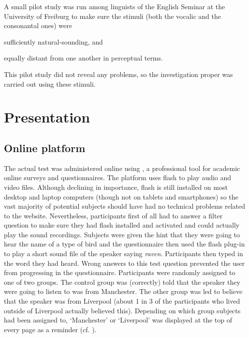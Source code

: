 A small pilot study was run among linguists of the English Seminar at the University of Freiburg to make sure the stimuli (both the vocalic and the consonantal ones) were
\begin{inparaenum}[(a)]
	\item sufficiently natural-sounding, and
	\item equally distant from one another in perceptual terms.
\end{inparaenum}
This pilot study did not reveal any problems, so the investigation proper was carried out using these stimuli.

\section{Presentation}
\label{sec.perc_method.pres}

\subsection{Online platform}
\label{sec.perc_method.pres.platform}

The actual test was administered online using \textcite{sosci}, a professional tool for academic online surveys and questionnaires.
The platform uses flash to play audio and video files.
Although declining in importance, flash is still installed on most desktop and laptop computers (though not on tablets and smartphones) so the vast majority of potential subjects should have had no technical problems related to the website.
Nevertheless, participants first of all had to answer a filter question to make sure they had flash installed and activated and could actually play the sound recordings.
Subjects were given the hint that they were going to hear the name of a type of bird and the questionnaire then used the flash plug-in to play a short sound file of the speaker saying \emph{raven}.
Participants then typed in the word they had heard.
Wrong answers to this test question prevented the user from progressing in the questionnaire.
Participants were randomly assigned to one of two groups.
The control group was (correctly) told that the speaker they were going to listen to was from Manchester.
The other group was led to believe that the speaker was from Liverpool (about 1 in 3 of the participants who lived outside of Liverpool actually believed this).
Depending on which group subjects had been assigned to, `Manchester' or `Liverpool' was displayed at the top of every page as a reminder (cf. ).

